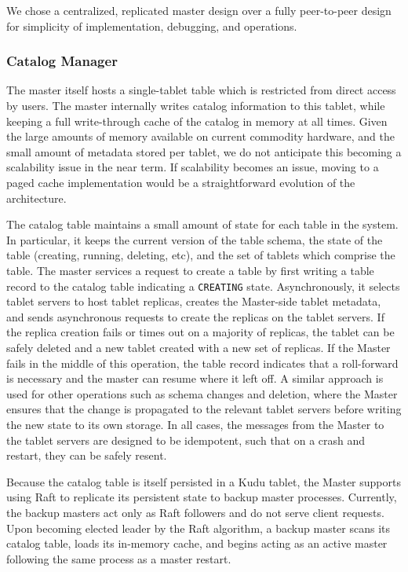 \documentclass[twocolumn,9pt]{article}
\begin{document}
We chose a centralized, replicated master design over a fully peer-to-peer design for simplicity of implementation,
debugging, and operations.

\subsubsection{Catalog Manager}

The master itself hosts a single-tablet table which is restricted from direct access by users.
The master internally writes catalog information to this tablet, while keeping a
full write-through cache of the catalog in memory at all times. Given the large amounts of
memory available on current commodity hardware, and the small amount of metadata stored per tablet, we do not
anticipate this becoming a scalability issue in the near term. If scalability becomes an issue, moving to a
paged cache implementation would be a straightforward evolution of the architecture.

The catalog table maintains a small amount of state for each table in the system. In particular, it keeps
the current version of the table schema, the state of the table (creating, running, deleting, etc),
and the set of tablets which comprise the table. The master services a request to create
a table by first writing a table record to the catalog table indicating a {\tt CREATING}
state. Asynchronously, it selects tablet servers to host tablet replicas, creates the Master-side
tablet metadata, and sends asynchronous requests to create the replicas on the tablet servers.
If the replica creation fails or times out on a majority of replicas, the tablet can be safely deleted
and a new tablet created with a new set of replicas. If the Master fails in the middle
of this operation, the table record indicates that a roll-forward is necessary and the
master can resume where it left off. A similar approach is used for other operations such
as schema changes and deletion, where the Master ensures that the change is propagated to
the relevant tablet servers before writing the new state to its own storage. In all cases, the
messages from the Master to the tablet servers are designed to be idempotent, such that on
a crash and restart, they can be safely resent.

Because the catalog table is itself persisted in a Kudu tablet, the Master supports using
Raft to replicate its persistent state to backup master processes. Currently, the
backup masters act only as Raft followers and do not serve client requests. Upon becoming
elected leader by the Raft algorithm, a backup master scans its catalog table, loads
its in-memory cache, and begins acting as an active master following the same process
as a master restart.
\end{document}
